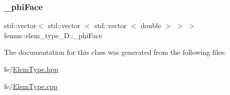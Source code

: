 \subsubsection{\texorpdfstring{\+\_\+phi\+Face}{\_phiFace}}
{\footnotesize\ttfamily std\+::vector$<$ std\+::vector $<$ std\+::vector $<$ double $>$ $>$ $>$ femus\+::elem\+\_\+type\+\_\+D\+::\+\_\+phi\+Face}



The documentation for this class was generated from the following files\+:\begin{DoxyCompactItemize}
\item 
fe/\mbox{\hyperlink{_elem_type_8hpp}{Elem\+Type.\+hpp}}\item 
fe/\mbox{\hyperlink{_elem_type_8cpp}{Elem\+Type.\+cpp}}\end{DoxyCompactItemize}
